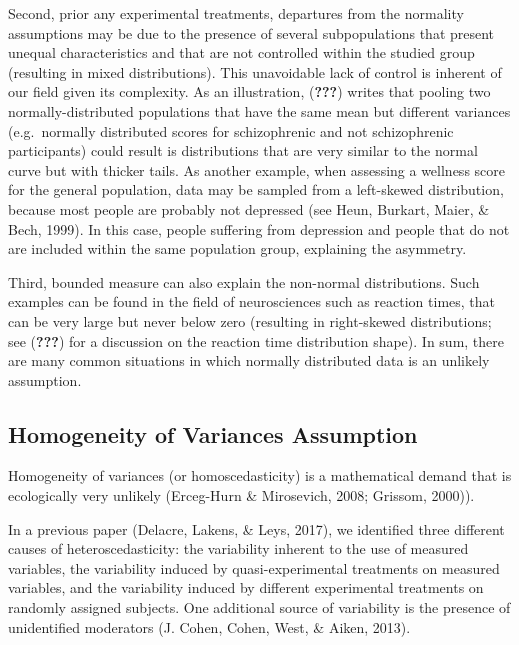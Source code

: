 \documentclass[man,floatsintext]{apa6}
\begin{document}
Second, prior any experimental treatments, departures from the normality
assumptions may be due to the presence of several subpopulations that
present unequal characteristics and that are not controlled within the
studied group (resulting in mixed distributions). This unavoidable lack
of control is inherent of our field given its complexity. As an
illustration, ({\textbf{???}}) writes that pooling two
normally-distributed populations that have the same mean but different
variances (e.g.~normally distributed scores for schizophrenic and not
schizophrenic participants) could result is distributions that are very
similar to the normal curve but with thicker tails. As another example,
when assessing a wellness score for the general population, data may be
sampled from a left-skewed distribution, because most people are
probably not depressed (see Heun, Burkart, Maier, \& Bech, 1999). In
this case, people suffering from depression and people that do not are
included within the same population group, explaining the asymmetry.

Third, bounded measure can also explain the non-normal distributions.
Such examples can be found in the field of neurosciences such as
reaction times, that can be very large but never below zero (resulting
in right-skewed distributions; see ({\textbf{???}}) for a discussion on
the reaction time distribution shape). In sum, there are many common
situations in which normally distributed data is an unlikely assumption.

\subsection{Homogeneity of Variances
Assumption}\label{homogeneity-of-variances-assumption}

Homogeneity of variances (or homoscedasticity) is a mathematical demand
that is ecologically very unlikely (Erceg-Hurn \& Mirosevich, 2008;
Grissom, 2000)).

In a previous paper (Delacre, Lakens, \& Leys, 2017), we identified
three different causes of heteroscedasticity: the variability inherent
to the use of measured variables, the variability induced by
quasi-experimental treatments on measured variables, and the variability
induced by different experimental treatments on randomly assigned
subjects. One additional source of variability is the presence of
unidentified moderators (J. Cohen, Cohen, West, \& Aiken, 2013).
\end{document}
